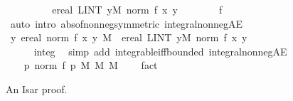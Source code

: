 \documentclass[leqno]{article}
\theoremstyle{definition}
\begin{document}
\begin{figure}
\begin{isabellebody}
\ \ \ \ \isamarkupfalse%
\ \isamarkupfalse%
\ {\isachardoublequoteopen}{\isasymdots}\ {\isacharequal}\ ereal\ {\isasymbar}LINT\ y{\isacharbar}M{}{\isachardot}\ norm\ {\isacharparenleft}f\ {\isacharparenleft}x{\isacharcomma}\ y{\isacharparenright}{\isacharparenright}{\isasymbar}{\isachardoublequoteclose}\isanewline
\ \ \ \ \ \ \isamarkupfalse%
\ f\ \isamarkupfalse%
\ {\isacharparenleft}auto\ intro{\isacharbang}{\isacharcolon}\ abs{\isacharunderscore}of{\isacharunderscore}nonneg{\isacharbrackleft}symmetric{\isacharbrackright}\ integral{\isacharunderscore}nonneg{\isacharunderscore}AE{\isacharparenright}\isanewline
\ \ \ \ \isamarkupfalse%
\ \isamarkupfalse%
\ {\isachardoublequoteopen}{\isacharparenleft}{\isasymintegral}\isactrlsup {\isacharplus}y{\isachardot}\ ereal\ {\isacharparenleft}norm\ {\isacharparenleft}f\ {\isacharparenleft}x{\isacharcomma}\ y{\isacharparenright}{\isacharparenright}{\isacharparenright}\ {\isasympartial}M{}{\isacharparenright}\ {\isacharequal}\ ereal\ {\isasymbar}LINT\ y{\isacharbar}M{}{\isachardot}\ norm\ {\isacharparenleft}f\ {\isacharparenleft}x{\isacharcomma}\ y{\isacharparenright}{\isacharparenright}{\isasymbar}{\isachardoublequoteclose}\ \isacommand{{\isachardot}}\isamarkupfalse%
\isanewline
\ \ \isamarkupfalse%
\isanewline
\ \ \isamarkupfalse%
\ \isamarkupfalse%
\ {\isachardoublequoteopen}{\isasymdots}\ {\isacharless}\ {\isasyminfinity}{\isachardoublequoteclose}\isanewline
\ \ \ \ \isamarkupfalse%
\ integ{}\ \isamarkupfalse%
\ {\isacharparenleft}simp\ add{\isacharcolon}\ integrable{\isacharunderscore}iff{\isacharunderscore}bounded\ integral{\isacharunderscore}nonneg{\isacharunderscore}AE{\isacharparenright}\isanewline
\ \ \isamarkupfalse%
\ \isamarkupfalse%
\ {\isachardoublequoteopen}{\isacharparenleft}{\isasymintegral}\isactrlsup {\isacharplus}\ p{\isachardot}\ norm\ {\isacharparenleft}f\ p{\isacharparenright}\ {\isasympartial}{\isacharparenleft}M{}\ {\isasymOtimes}\isactrlsub M\ M{}{\isacharparenright}{\isacharparenright}\ {\isacharless}\ {\isasyminfinity}{\isachardoublequoteclose}\ \isacommand{{\isachardot}}\isamarkupfalse%
\isanewline
{}\isamarkupfalse%
\ fact%
\end{isabellebody}
\caption{An Isar proof.}
\label{fig:isar}
\end{figure}
\end{document}
